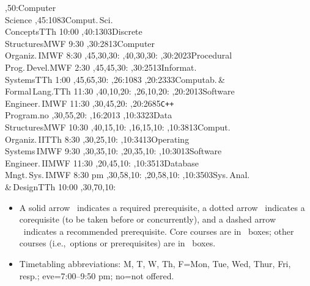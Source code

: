\documentclass{article}
\begin{document}
\thispagestyle{empty}
\setcounter{diagheight}{50}


\begin{chart}
,50:{\Large Computer\\\Large Science}
,45:{1083}{Comput.\,Sci.\\Concepts}{TTh 10:00}
,40:{1303}{Discrete\\Structures}{MWF 9:30}
,30:{2813}{Computer\\Organiz.\,I}{MWF 8:30}
  ,45,30,30:
  ,40,30,30:
,30:{2023}{Procedural\\Prog.\,Devel.}{MWF 2:30}
  ,45,45,30:
,30:{2513}{Informat.\\Systems}{TTh 1:00}
  ,45,65,30:
,26:{1083}
,20:{2333}{Computab.\,\&\\Formal\,Lang.}{TTh 11:30}
  ,40,10,20:
  ,26,10,20:
,20:{2013}{Software\\Engineer.\,I}{MWF 11:30}
  ,30,45,20:
,20:{2685}{\texttt{C++}\\Program.}{no}
  ,30,55,20:
,16:{2013}
,10:{3323}{Data\\Structures}{MWF 10:30}
  ,40,15,10:
  ,16,15,10:
,10:{3813}{Comput.\\Organiz.\,II}{TTh 8:30}
  ,30,25,10:
,10:{3413}{Operating\\Systems\,I}{MWF 9:30}
  ,30,35,10:
  ,20,35,10:
,10:{3013}{Software\\Engineer.\,II}{MWF 11:30}
  ,20,45,10:
,10:{3513}{Database\\Mngt.\,Sys.\,I}{MWF 8:30 pm}
  ,30,58,10:
  ,20,58,10:
,10:{3503}{Sys.\,Anal.\\\&\,Design}{TTh 10:00}
  ,30,70,10:
\end{chart}

\begin{center}
\begin{minipage}{6.0in}
\begin{itemize}
\item
A solid arrow \solidarrow\  indicates a required prerequisite, 
a dotted arrow \dottedarrow\ 
indicates a corequisite (to be taken before or concurrently), and a
dashed arrow \dashedarrow\ indicates a recommended prerequisite.
Core courses are in \boldbox\ boxes; 
other courses (i.e.,~options or prerequisites)
are in \lightbox\ boxes.
\item Timetabling abbreviations: M, T, W, Th, F=Mon, Tue, Wed, Thur, Fri, resp.; eve=7:00--9:50 pm; no=not offered.
\end{itemize}
\end{minipage}
\end{center}
\end{document}
